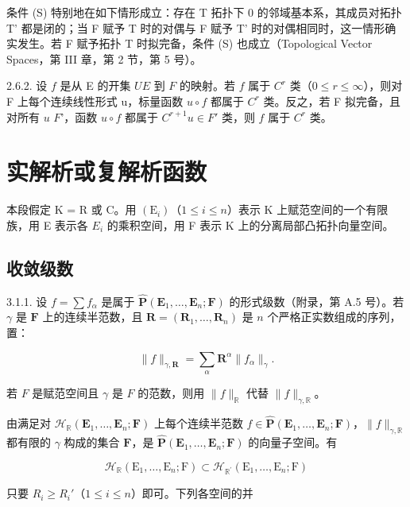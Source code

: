 条件 (S) 特别地在如下情形成立：存在 T 拓扑下 0 的邻域基本系，其成员对拓扑 T' 都是闭的；当 F 赋予 T 时的对偶与 F 赋予 T' 时的对偶相同时，这一情形确实发生。若 F 赋予拓扑 T 时拟完备，条件 (S) 也成立（Topological Vector Spaces，第 III 章，第 2 节，第 5 号）。

2.6.2. 设 \(f\) 是从 E 的开集 \(U\)\(E\) 到 \(F\) 的映射。若 \(f\) 属于 \(C^r\) 类（\(0 \leqslant r \leqslant \infty\)），则对 F 上每个连续线性形式 u，标量函数 \(u \circ f\) 都属于 \(C^r\) 类。反之，若 F 拟完备，且对所有 \(u\)  \(F\)'，函数 \(u \circ f\) 都属于 \(C^{r+1}\)\(u \in F'\) 类，则 \(f\) 属于 \(C^r\) 类。

\section{实解析或复解析函数}

本段假定 K = R 或 C。用 \((\mathrm{E}_{i})\)（\(1 \leqslant i \leqslant n\)）表示 K 上赋范空间的一个有限族，用 E 表示各 \(E_{i}\) 的乘积空间，用 F 表示 K 上的分离局部凸拓扑向量空间。

\subsection{收敛级数}

3.1.1. 设 \(f = \sum f_{\alpha}\) 是属于 \(\hat{\mathbf{P}}(\mathbf{E}_1, \ldots, \mathbf{E}_n; \mathbf{F})\) 的形式级数（附录，第 A.5 号）。若 \(\gamma\) 是 \(\mathbf{F}\) 上的连续半范数，且 \(\mathbf{R} = (\mathbf{R}_1, \ldots, \mathbf{R}_n)\) 是 \(n\) 个严格正实数组成的序列，置：

\[
\| f \| _ {\gamma , \mathbf {R}} = \sum_ {\alpha} \mathbf {R} ^ {\alpha} \| f _ {\alpha} \| _ {\gamma}.
\]

若 \(F\) 是赋范空间且 \(\gamma\) 是 \(F\) 的范数，则用 \(\| f \|_{\mathbb{R}}\) 代替 \(\| f \|_{\gamma, \mathbb{R}}\)。

由满足对 \(\mathcal{H}_{\mathbb{R}}(\mathbf{E}_{1},\ldots,\mathbf{E}_{n};\mathbf{F})\) 上每个连续半范数 \(f\in\hat{\mathbf{P}}(\mathbf{E}_{1},\ldots,\mathbf{E}_{n};\mathbf{F})\)，\(\|f\|_{\gamma,\mathbb{R}}\) 都有限的 \(\gamma\) 构成的集合 \(\mathbf{F}\)，是 \(\hat{\mathbf{P}}(\mathbf{E}_{1},\ldots,\mathbf{E}_{n};\mathbf{F})\) 的向量子空间。有

\[
\mathcal {H} _ {\mathbb {R}} (\mathrm{E} _ {1}, \dots , \mathrm{E} _ {n}; \mathrm{F}) \subset \mathcal {H} _ {\mathbb {R} ^ {\prime}} (\mathrm{E} _ {1}, \dots , \mathrm{E} _ {n}; \mathrm{F})
\]

只要 \(R_{i} \geqslant R_{i}'\)（\(1 \leqslant i \leqslant n\)）即可。下列各空间的并

